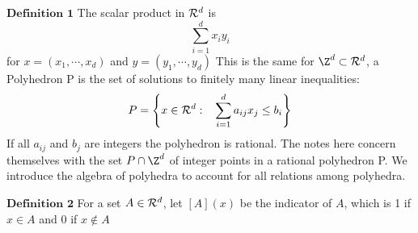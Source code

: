 \begin{description}
$\textbf{Definition 1}$ The scalar product in $\mathcal{R}^d$ is 
$$\sum^d_{i=1}x_iy_i$$
for $x=(x_1,\cdots , x_d)$ and $y=(y_1,\cdots , y_d)$
This is the same for $\Z^d\subset\R^d$, a Polyhedron P is the set of solutions to finitely many linear inequalities:
$$P=\left\lbrace x\in\mathcal{R}^d:\hspace{3mm}\sum^d_{i=1}a_{ij}x_j\leq b_i \right\rbrace$$
If all $a_{ij}$ and $b_j$ are integers the polyhedron is rational. The notes here concern themselves with the set $P\cap\Z^d$ of integer points in a rational polyhedron P. We introduce the algebra of polyhedra to account for all relations among polyhedra. 

$\textbf{Definition 2}$ For a set $A\in\mathcal{R}^d$, let $[A](x)$ be the indicator of $A$, which is 1 if $x\in A$ and 0 if $x\notin A$         
\end{description}
